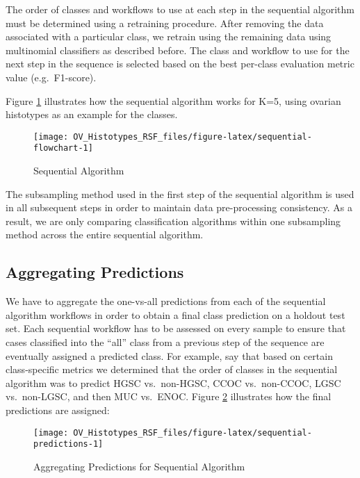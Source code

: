 \documentclass[
]{report}
\begin{document}
The order of classes and workflows to use at each step in the sequential algorithm must be determined using a retraining procedure. After removing the data associated with a particular class, we retrain using the remaining data using multinomial classifiers as described before. The class and workflow to use for the next step in the sequence is selected based on the best per-class evaluation metric value (e.g.~F1-score).

Figure \ref{fig:sequential-flowchart} illustrates how the sequential algorithm works for K=5, using ovarian histotypes as an example for the classes.

\begin{figure}[H]

{\centering \texttt{[image: OV\_Histotypes\_RSF\_files/figure-latex/sequential-flowchart-1]} 

}

\caption{Sequential Algorithm}\label{fig:sequential-flowchart}
\end{figure}

The subsampling method used in the first step of the sequential algorithm is used in all subsequent steps in order to maintain data pre-processing consistency. As a result, we are only comparing classification algorithms within one subsampling method across the entire sequential algorithm.

\hypertarget{aggregating-predictions}{%
\subsection{Aggregating Predictions}\label{aggregating-predictions}}

We have to aggregate the one-vs-all predictions from each of the sequential algorithm workflows in order to obtain a final class prediction on a holdout test set. Each sequential workflow has to be assessed on every sample to ensure that cases classified into the ``all'' class from a previous step of the sequence are eventually assigned a predicted class. For example, say that based on certain class-specific metrics we determined that the order of classes in the sequential algorithm was to predict HGSC vs.~non-HGSC, CCOC vs.~non-CCOC, LGSC vs.~non-LGSC, and then MUC vs.~ENOC. Figure \ref{fig:sequential-predictions} illustrates how the final predictions are assigned:

\begin{figure}[H]

{\centering \texttt{[image: OV\_Histotypes\_RSF\_files/figure-latex/sequential-predictions-1]} 

}

\caption{Aggregating Predictions for Sequential Algorithm}\label{fig:sequential-predictions}
\end{figure}
\end{document}
